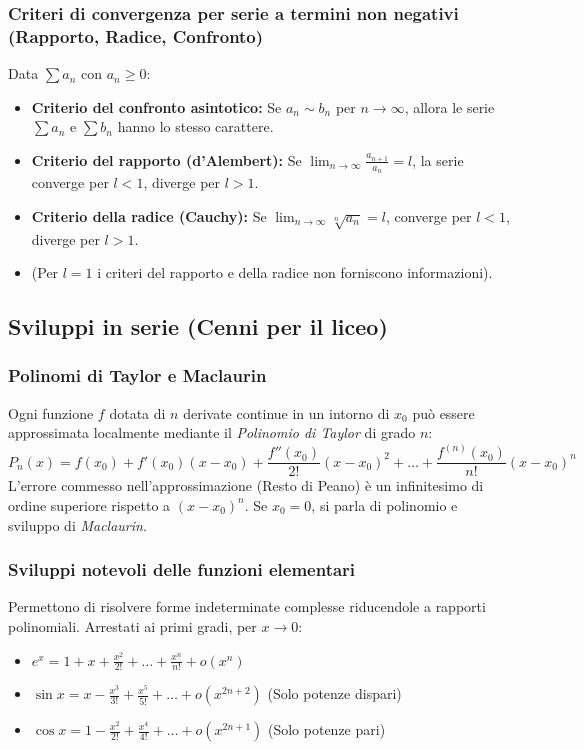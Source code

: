 \subsubsection{Criteri di convergenza per serie a termini non negativi (Rapporto, Radice, Confronto)}
Data $\sum a_n$ con $a_n \ge 0$:
\begin{itemize}
    \item \textbf{Criterio del confronto asintotico:} Se $a_n \sim b_n$ per $n \to \infty$, allora le serie $\sum a_n$ e $\sum b_n$ hanno lo stesso carattere.
    \item \textbf{Criterio del rapporto (d'Alembert):} Se $\lim_{n \to \infty} \frac{a_{n+1}}{a_n} = l$, la serie converge per $l < 1$, diverge per $l > 1$.
    \item \textbf{Criterio della radice (Cauchy):} Se $\lim_{n \to \infty} \sqrt[n]{a_n} = l$, converge per $l < 1$, diverge per $l > 1$. 
    \item (Per $l=1$ i criteri del rapporto e della radice non forniscono informazioni).
\end{itemize}

\subsection{Sviluppi in serie (Cenni per il liceo)}
\subsubsection{Polinomi di Taylor e Maclaurin}
Ogni funzione $f$ dotata di $n$ derivate continue in un intorno di $x_0$ può essere approssimata localmente mediante il \textit{Polinomio di Taylor} di grado $n$:
\[ P_n(x) = f(x_0) + f'(x_0)(x - x_0) + \frac{f''(x_0)}{2!}(x - x_0)^2 + \dots + \frac{f^{(n)}(x_0)}{n!}(x - x_0)^n \]
L'errore commesso nell'approssimazione (Resto di Peano) è un infinitesimo di ordine superiore rispetto a $(x-x_0)^n$. Se $x_0 = 0$, si parla di polinomio e sviluppo di \textit{Maclaurin}.

\subsubsection{Sviluppi notevoli delle funzioni elementari}
Permettono di risolvere forme indeterminate complesse riducendole a rapporti polinomiali. Arrestati ai primi gradi, per $x \to 0$:
\begin{itemize}
    \item $e^x = 1 + x + \frac{x^2}{2!} + \dots + \frac{x^n}{n!} + o(x^n)$
    \item $\sin x = x - \frac{x^3}{3!} + \frac{x^5}{5!} + \dots + o(x^{2n+2})$ \quad (Solo potenze dispari)
    \item $\cos x = 1 - \frac{x^2}{2!} + \frac{x^4}{4!} + \dots + o(x^{2n+1})$ \quad (Solo potenze pari)
\end{itemize}

